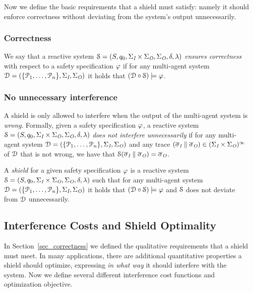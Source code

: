 Now we define the basic  requirements that a shield must satisfy: namely it should enforce correctness without deviating from the system's output unnecessarily.

\subsubsection{Correctness} We say that a reactive system $\mathcal{S} = (S,q_{0},\Sigma_{\textit{I}}\times\Sigma_{\textit{O}},\Sigma_{\textit{O}},\delta,\lambda)$   \emph{ensures correctness}  with respect to a safety specification $\varphi$ if for any multi-agent system
$\mathcal{D}=( \{\mathcal{P}_1,\ldots,\mathcal{P}_n\},\Sigma_{\textit{I}},  \Sigma_{\textit{O}})$ it holds that $(\mathcal{D} \circ  \mathcal{S}) \models \varphi$.

\subsubsection{No unnecessary interference}
A shield is only allowed to interfere when the output of the multi-agent system  is \emph{wrong}.
%
Formally, given a safety specification $\varphi$, a reactive system $\mathcal{S} = (S,q_{0},\Sigma_{\textit{I}}\times\Sigma_{\textit{O}},\Sigma_{\textit{O}},\delta,\lambda)$ \emph{does not interfere unnecessarily} if for any multi-agent system $\mathcal{D}=( \{\mathcal{P}_1,\ldots,\mathcal{P}_n\},\Sigma_{\textit{I}},  \Sigma_{\textit{O}})$ and any trace
$(\overline\sigma_{\textit{I}}\parallel\overline\sigma_{\textit{O}})\in (\Sigma_{\textit{I}} \times \Sigma_{\textit{O}})^\infty$
of $\mathcal{D}$ that is not wrong, we have that $\mathcal{S}(\overline\sigma_{\textit{I}} \parallel  \overline\sigma_{\textit{O}}) = \overline\sigma_{\textit{O}}$.

\begin{defn}
A \emph{shield} for a given safety specification $\varphi$ is a reactive system $\mathcal{S} = (S,q_{0},\Sigma_{\textit{I}}\times\Sigma_{\textit{O}},\Sigma_{\textit{O}},\delta,\lambda)$
such that  for any multi-agent system $\mathcal{D}=( \{\mathcal{P}_1,\ldots,\mathcal{P}_n\},\Sigma_{\textit{I}},  \Sigma_{\textit{O}})$ it holds that $(\mathcal{D} \circ \mathcal{S}) \models \varphi$ and $\mathcal{S}$  does not deviate from $\mathcal{D}$ unnecessarily.
\end{defn}

\subsection{Interference Costs and Shield Optimality}
\label{sec_interf}

In Section~\ref{sec_correctness} we defined the qualitative requirements that a shield must meet. In many applications, there are additional quantitative properties a shield should optimize, expressing \emph{in what way} it should interfere with the system.
Now  we define several different interference cost functions and  optimization objective.

